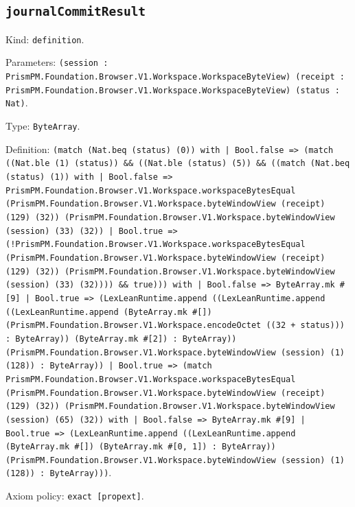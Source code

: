 \documentclass[11pt]{article}
\begin{document}
\subsection*{\texttt{journalCommitResult}}
\noindent Kind: \texttt{definition}.\par
\noindent Parameters: \texttt{(session : PrismPM.Foundation.Browser.V1.Workspace.WorkspaceByteView) (receipt : PrismPM.Foundation.Browser.V1.Workspace.WorkspaceByteView) (status : Nat)}.\par
\noindent Type: \texttt{ByteArray}.\par
\noindent Definition: \texttt{(match (Nat.beq (status) (0)) with | Bool.false => (match ((Nat.ble (1) (status)) \&\& ((Nat.ble (status) (5)) \&\& ((match (Nat.beq (status) (1)) with | Bool.false => PrismPM.Foundation.Browser.V1.Workspace.workspaceBytesEqual (PrismPM.Foundation.Browser.V1.Workspace.byteWindowView (receipt) (129) (32)) (PrismPM.Foundation.Browser.V1.Workspace.byteWindowView (session) (33) (32)) | Bool.true => (!PrismPM.Foundation.Browser.V1.Workspace.workspaceBytesEqual (PrismPM.Foundation.Browser.V1.Workspace.byteWindowView (receipt) (129) (32)) (PrismPM.Foundation.Browser.V1.Workspace.byteWindowView (session) (33) (32)))) \&\& true))) with | Bool.false => ByteArray.mk \#[9] | Bool.true => (LexLeanRuntime.append ((LexLeanRuntime.append ((LexLeanRuntime.append (ByteArray.mk \#[]) (PrismPM.Foundation.Browser.V1.Workspace.encodeOctet ((32 + status))) : ByteArray)) (ByteArray.mk \#[2]) : ByteArray)) (PrismPM.Foundation.Browser.V1.Workspace.byteWindowView (session) (1) (128)) : ByteArray)) | Bool.true => (match PrismPM.Foundation.Browser.V1.Workspace.workspaceBytesEqual (PrismPM.Foundation.Browser.V1.Workspace.byteWindowView (receipt) (129) (32)) (PrismPM.Foundation.Browser.V1.Workspace.byteWindowView (session) (65) (32)) with | Bool.false => ByteArray.mk \#[9] | Bool.true => (LexLeanRuntime.append ((LexLeanRuntime.append (ByteArray.mk \#[]) (ByteArray.mk \#[0, 1]) : ByteArray)) (PrismPM.Foundation.Browser.V1.Workspace.byteWindowView (session) (1) (128)) : ByteArray)))}.\par
\noindent Axiom policy: \texttt{exact [propext]}.\par
\end{document}
